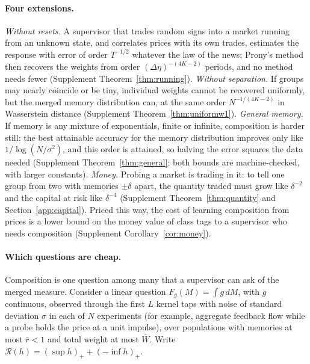 \paragraph{Four extensions.} \emph{Without resets.} A supervisor that trades random signs into a market running from an unknown state, and correlates prices with its own trades, estimates the response with error of order $T^{-1/2}$ whatever the law of the news; Prony's method then recovers the weights from order $(\Delta\eta)^{-(4K-2)}$ periods, and no method needs fewer (Supplement Theorem~\ref{thm:running}). \emph{Without separation.} If groups may nearly coincide or be tiny, individual weights cannot be recovered uniformly, but the merged memory distribution can, at the same order $N^{-1/(4K-2)}$ in Wasserstein distance (Supplement Theorem~\ref{thm:uniformw1}). \emph{General memory.} If memory is any mixture of exponentials, finite or infinite, composition is harder still: the best attainable accuracy for the memory distribution improves only like $1/\log(N/\sigma^2)$, and this order is attained, so halving the error squares the data needed (Supplement Theorem~\ref{thm:general}; both bounds are machine-checked, with larger constants). \emph{Money.} Probing a market is trading in it: to tell one group from two with memories $\pm\delta$ apart, the quantity traded must grow like $\delta^{-2}$ and the capital at risk like $\delta^{-4}$ (Supplement Theorem~\ref{thm:quantity} and Section~\ref{app:capital}). Priced this way, the cost of learning composition from prices is a lower bound on the money value of class tags to a supervisor who needs composition (Supplement Corollary~\ref{cor:money}).

\paragraph{Which questions are cheap.} Composition is one question among many that a supervisor can ask of the merged measure. Consider a linear question $F_g(M)=\int g\,dM$, with $g$ continuous, observed through the first $L$ kernel taps with noise of standard deviation $\sigma$ in each of $N$ experiments (for example, aggregate feedback flow while a probe holds the price at a unit impulse), over populations with memories at most $\bar r<1$ and total weight at most $\bar W$. Write $\mathcal R(h)=(\sup h)_++(-\inf h)_+$.

